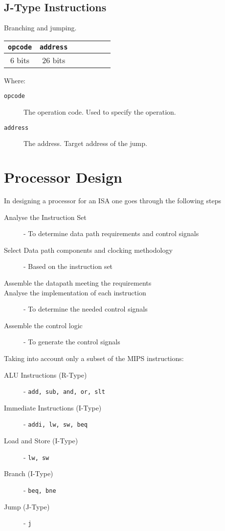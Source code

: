 \documentclass[12pt letter]{report}
\begin{document}
\section{J-Type Instructions}

Branching and jumping.

\begin{table}[h!]
  \begin{center}
    \begin{tabular}{|c|c|c|c|c|c|c|}
      \hline
      \texttt{opcode} & \texttt{address} \\
      \hline
      6 bits          & 26 bits          \\
      \hline
    \end{tabular}
  \end{center}
\end{table}

Where:
\begin{description}
  \item[\texttt{opcode}] The operation code. Used to specify the operation.
  \item[\texttt{address}] The address. Target address of the jump.
\end{description}

\chapter{Processor Design}

In designing a processor for an ISA one goes through the following steps
\begin{description}
  \item[Analyse the Instruction Set ] - To determine data path requirements and control signals
  \item[Select Data path components and clocking methodology] - Based on the instruction set
  \item[Assemble the datapath meeting the requirements]
  \item[Analyse the implementation of each instruction] - To determine the needed control signals
  \item[Assemble the control logic] - To generate the control signals
\end{description}

Taking into account only a subset of the MIPS instructions:
\begin{description}
  \item[ALU Instructions (R-Type)] - \texttt{add, sub, and, or, slt}
  \item[Immediate Instructions (I-Type)] - \texttt{addi, lw, sw, beq}
  \item[Load and Store (I-Type)] - \texttt{lw, sw}
  \item[Branch (I-Type)] - \texttt{beq, bne}
  \item[Jump (J-Type)] - \texttt{j}
\end{description}
\end{document}
